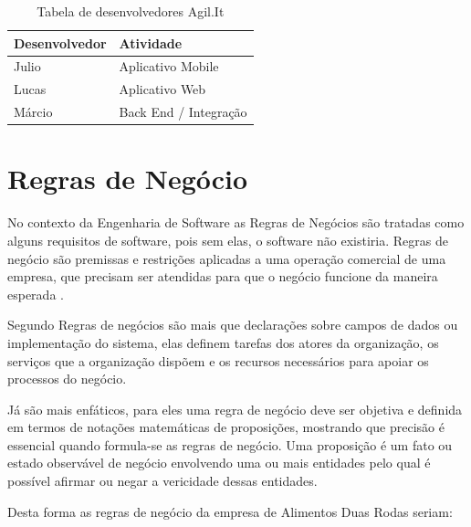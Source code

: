 \begin{table}[H]
	\centering
	\caption{\label{tabela_desenvolvedores}Tabela de desenvolvedores Agil.It}
	\begin{tabular}{|l|l|}
		\hline
		\textbf{Desenvolvedor} & \textbf{Atividade}    \\ \hline
		Julio                  & Aplicativo Mobile     \\ \hline
		Lucas                  & Aplicativo Web        \\ \hline
		Márcio                 & Back End / Integração \\ \hline
	\end{tabular}
\end{table}



\section{Regras de Negócio}
No contexto da Engenharia de Software as Regras de Negócios são tratadas como alguns requisitos de software, pois sem elas, o software não existiria. Regras de negócio são premissas e restrições aplicadas a uma operação comercial de uma empresa, que precisam ser atendidas para que o negócio funcione da maneira esperada \cite{crerie2008identificacao}.

Segundo \cite{2001SilviaInes} Regras de negócios são mais que declarações sobre campos de dados ou implementação do sistema, elas definem tarefas dos atores da organização, os serviços que a organização dispõem e os recursos necessários para apoiar os processos do negócio.

Já \cite{1997kilovSimmonds} são mais enfáticos, para eles uma regra de negócio deve ser objetiva e definida em termos de notações matemáticas de proposições, mostrando que precisão é essencial quando formula-se as regras de negócio. Uma proposição é um fato ou estado observável de negócio envolvendo uma ou mais entidades pelo qual é possível afirmar ou negar a vericidade dessas entidades.

Desta forma as regras de negócio da empresa de Alimentos Duas Rodas seriam:

